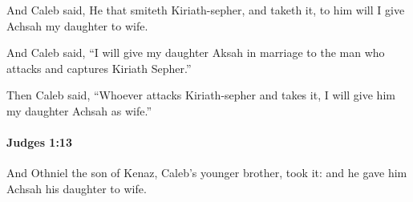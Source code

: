 			\begin{versebox}
					\item[BHS] 
					\item[ASV] And Caleb said, He that smiteth Kiriath-sepher, and taketh it, to him will I give Achsah my daughter to wife.
					\item[NIV] And Caleb said, “I will give my daughter Aksah in marriage to the man who attacks and captures Kiriath Sepher.”
					\item[NRSV] Then Caleb said, “Whoever attacks Kiriath-sepher and takes it, I will give him my daughter Achsah as wife.”
			\end{versebox}

		\paragraph{Judges 1:13} %
			\label{JUDGES-1-13}

			And Othniel the son of Kenaz, Caleb’s younger brother, took it: and he gave him Achsah his daughter to wife.

